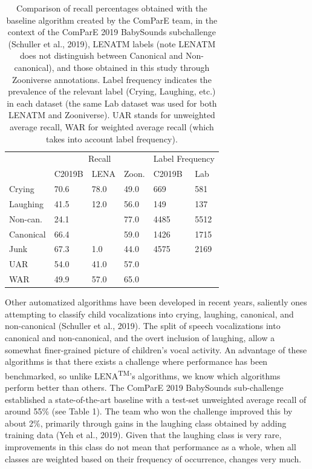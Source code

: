 \documentclass[english,,man]{apa6}
\begin{document}
\begin{table}

\caption{\label{tab:tab-LENA-challenge}Comparison of recall percentages obtained with the baseline algorithm created by the ComParE team, in the context of the ComParE 2019 BabySounds subchallenge (Schuller et al., 2019), LENATM labels (note LENATM does not distinguish between Canonical and Non-canonical), and those obtained in this study through Zooniverse annotations. Label frequency indicates the prevalence of the relevant label (Crying, Laughing, etc.) in each dataset (the same Lab dataset was used for both LENATM and Zooniverse). UAR stands for unweighted average recall, WAR for weighted average recall (which takes into account label frequency).}
\centering
\begin{tabular}[t]{l|l|l|l|l|l}
\hline
\multicolumn{1}{c|}{ } & \multicolumn{3}{c|}{Recall} & \multicolumn{2}{c}{Label Frequency} \\
\cline{2-4} \cline{5-6}
 & C2019B & LENA & Zoon. & C2019B & Lab\\
\hline
Crying & 70.6 & 78.0 & 49.0 & 669 & 581\\
\cline{1-6}
Laughing & 41.5 & 12.0 & 56.0 & 149 & 137\\
\cline{1-6}
Non-can. & 24.1 &  & 77.0 & 4485 & 5512\\
\cline{1-2}
\cline{4-6}
Canonical & 66.4 & \multirow{-2}{*}{\raggedright\arraybackslash 73.0} & 59.0 & 1426 & 1715\\
\cline{1-6}
Junk & 67.3 & 1.0 & 44.0 & 4575 & 2169\\
\cline{1-6}
UAR & 54.0 & 41.0 & 57.0 &  & \\
\cline{1-4}
WAR & 49.9 & 57.0 & 65.0 & \multirow{-2}{*}{\raggedright\arraybackslash } & \multirow{-2}{*}{\raggedright\arraybackslash }\\
\hline
\end{tabular}
\end{table}

Other automatized algorithms have been developed in recent years, saliently ones attempting to classify child vocalizations into crying, laughing, canonical, and non-canonical (Schuller et al., 2019). The split of speech vocalizations into canonical and non-canonical, and the overt inclusion of laughing, allow a somewhat finer-grained picture of children's vocal activity. An advantage of these algorithms is that there exists a challenge where performance has been benchmarked, so unlike LENA\textsuperscript{TM}'s algorithms, we know which algorithms perform better than others. The ComParE 2019 BabySounds sub-challenge established a state-of-the-art baseline with a test-set unweighted average recall of around 55\% (see Table 1). The team who won the challenge improved this by about 2\%, primarily through gains in the laughing class obtained by adding training data (Yeh et al., 2019). Given that the laughing class is very rare, improvements in this class do not mean that performance as a whole, when all classes are weighted based on their frequency of occurrence, changes very much.
\end{document}
